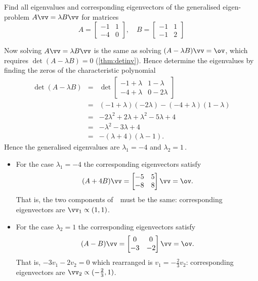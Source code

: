 \begin{example} \label{eg:}
Find all eigenvalues and corresponding eigenvectors of the generalised eigen-problem \(A\vv=\lambda B\vv\) for matrices
\begin{equation*}
A=\begin{bmatrix} -1&1\\-4&0 \end{bmatrix},\quad
B=\begin{bmatrix} -1&1\\-1&2 \end{bmatrix}
\end{equation*}
\begin{solution} 
Now solving \(A\vv=\lambda B\vv\) is the same as solving \((A-\lambda B)\vv=\ov\), which requires \(\det(A-\lambda B)=0\) (\autoref{thm:detinv}).
Hence determine the eigenvalues by finding the zeros of the characteristic polynomial
\begin{eqnarray*}
\det(A-\lambda B)
&=&\det\begin{bmatrix} -1+\lambda&1-\lambda\\-4+\lambda&0-2\lambda \end{bmatrix}
\\&=&(-1+\lambda)(-2\lambda)-(-4+\lambda)(1-\lambda)
\\&=&-2\lambda^2+2\lambda+\lambda^2-5\lambda+4
\\&=&-\lambda^2-3\lambda+4
\\&=&-(\lambda+4)(\lambda-1).
\end{eqnarray*}
Hence the generalised eigenvalues are \(\lambda_1=-4\) and \(\lambda_2=1\)\,.
\begin{itemize}
\item For the case \(\lambda_1=-4\) the corresponding eigenvectors satisfy
\begin{equation*}
(A+4B)\vv=\begin{bmatrix} -5&5\\-8&8 \end{bmatrix}\vv=\ov.
\end{equation*}
That is, the two components of~\vv\ must be the same: corresponding eigenvectors are \(\vv_1\propto(1,1)\).

\item For the case \(\lambda_2=1\) the corresponding eigenvectors satisfy
\begin{equation*}
(A-B)\vv=\begin{bmatrix} 0&0\\-3&-2 \end{bmatrix}\vv=\ov.
\end{equation*}
That is, \(-3v_1-2v_2=0\) which rearranged is \(v_1=-\tfrac23v_2\): corresponding eigenvectors are \(\vv_2\propto(-\tfrac23,1)\).
\end{itemize}
\end{solution}
\end{example}




